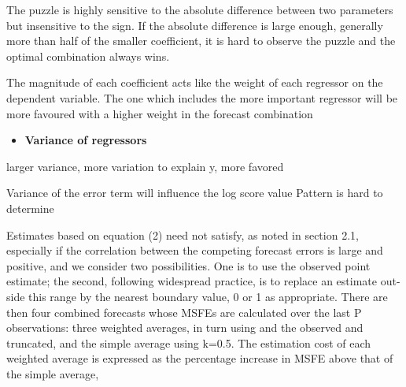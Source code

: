 \documentclass{monashthesis}
\begin{document}
The puzzle is highly sensitive to the absolute difference between two parameters but insensitive to the sign. If the absolute difference is large enough, generally more than half of the smaller coefficient, it is hard to observe the puzzle and the optimal combination always wins.

The magnitude of each coefficient acts like the weight of each regressor on the dependent variable.
The one which includes the more important regressor will be more favoured with a higher weight in the forecast combination

\begin{itemize}
\tightlist
\item
  \bf{Variance of regressors}
\end{itemize}

larger variance, more variation to explain y, more favored

Variance of the error term will influence the log score value
Pattern is hard to determine

Estimates based on equation (2) need not satisfy, as noted in section 2.1, especially if the correlation between the competing forecast errors is large and positive, and we consider two possibilities. One is to use the observed point estimate; the second, following widespread practice, is to replace an estimate out- side this range by the nearest boundary value, 0 or 1 as appropriate. There are then four combined forecasts whose MSFEs are calculated over the last P observations: three weighted averages, in turn using and the observed and truncated, and the simple average using k=0.5. The estimation cost of each weighted average is expressed as the percentage increase in MSFE above that of the simple average,

\vspace{0.3cm}
\end{document}
